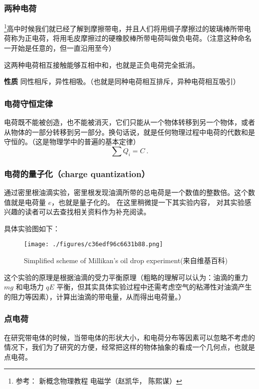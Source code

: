 
\subsubsection{两种电荷}
\footnote{参考： 新概念物理教程 电磁学（赵凯华， 陈熙谋）}高中时候我们就已经了解到摩擦带电，并且人们将用绸子摩擦过的玻璃棒所带电荷称为正电荷，将用毛皮摩擦过的硬橡胶棒所带电荷叫做负电荷。（注意这种命名一开始是任意的，但一直沿用至今）

这两种电荷相互接触能够互相中和，也就是正负电荷完全抵消。

\textbf{性质} 同性相斥，异性相吸。（也就是同种电荷相互排斥，异种电荷相互吸引）

\subsubsection{电荷守恒定律}
电荷既不能被创造，也不能被消灭，它们只能从一个物体转移到另一个物体，或者从物体的一部分转移到另一部分。换句话说，就是任何物理过程中电荷的代数和是守恒的。（这是物理学中的普遍的基本定律）
\begin{equation}
\sum Q_i=C~.
\end{equation}

\subsubsection{电荷的量子化（charge quantization）}
 通过密里根油滴实验，密里根发现油滴所带的总电荷是一个数值的整数倍。这个数值就是电荷量 $e$，也就是量子化的。
 在这里稍微提一下其实验内容， 对其实验感兴趣的读者可以去查找相关资料作为补充阅读。

具体实验图如下：

\begin{figure}[ht]
\centering
\texttt{[image: ./figures/c36edf96c6631b88.png]}
\caption{Simplified scheme of Millikan's oil drop experiment(来自维基百科)} \label{fig_EM1_1}
\end{figure}

这个实验的原理是根据油滴的受力平衡原理（粗略的理解可以认为：油滴的重力 $mg$ 和电场力 $qE$ 平衡，但其实具体实验过程中还需考虑空气的粘滞性对油滴产生的阻力等因素），计算出油滴的带电量，从而得出电荷量。）

\subsubsection{点电荷}

在研究带电体的时候，当带电体的形状大小，和电荷分布等因素可以忽略不考虑的情况下，我们为了研究的方便，经常把这样的物体抽象的看成一个几何点，也就是点电荷。

